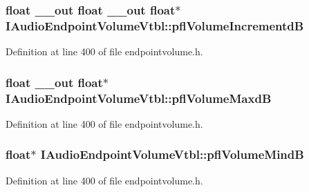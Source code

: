 \subsubsection[{\texorpdfstring{pfl\+Volume\+IncrementdB}{pflVolumeIncrementdB}}]{ float {\bf \+\_\+\+\_\+out} float {\bf \+\_\+\+\_\+out} float$\ast$ I\+Audio\+Endpoint\+Volume\+Vtbl\+::pfl\+Volume\+IncrementdB}\hypertarget{struct_i_audio_endpoint_volume_vtbl_add07a9ce433a209f058a60d9e2859ee7}{}\label{struct_i_audio_endpoint_volume_vtbl_add07a9ce433a209f058a60d9e2859ee7}


Definition at line 400 of file endpointvolume.\+h.

\subsubsection[{\texorpdfstring{pfl\+Volume\+MaxdB}{pflVolumeMaxdB}}]{ float {\bf \+\_\+\+\_\+out} float$\ast$ I\+Audio\+Endpoint\+Volume\+Vtbl\+::pfl\+Volume\+MaxdB}\hypertarget{struct_i_audio_endpoint_volume_vtbl_a8fc082e5e06a56bd6b5a957bbbf9ec38}{}\label{struct_i_audio_endpoint_volume_vtbl_a8fc082e5e06a56bd6b5a957bbbf9ec38}


Definition at line 400 of file endpointvolume.\+h.

\subsubsection[{\texorpdfstring{pfl\+Volume\+MindB}{pflVolumeMindB}}]{ float$\ast$ I\+Audio\+Endpoint\+Volume\+Vtbl\+::pfl\+Volume\+MindB}\hypertarget{struct_i_audio_endpoint_volume_vtbl_ae1251e4534363e9c3704763acb0adf44}{}\label{struct_i_audio_endpoint_volume_vtbl_ae1251e4534363e9c3704763acb0adf44}


Definition at line 400 of file endpointvolume.\+h.

